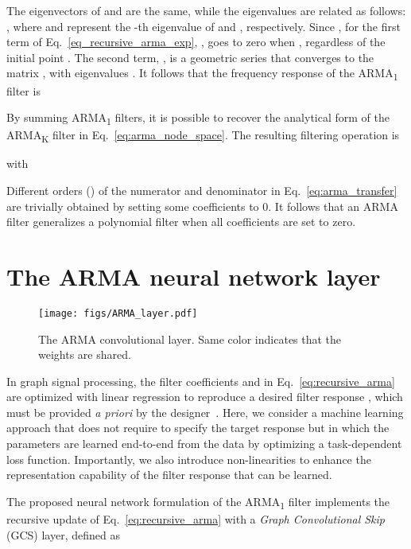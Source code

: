 \documentclass{article}
\begin{document}
The eigenvectors of  and  are the same, while the eigenvalues are related as follows: , where  and  represent the -th eigenvalue of  and , respectively. 
Since , for  the first term of Eq.~\eqref{eq_recursive_arma_exp}, , goes to zero when , regardless of the initial point .
The second term, , is a geometric series that converges to the matrix , with eigenvalues .
It follows that the frequency response of the ARMA\textsubscript{1} filter is



By summing  ARMA\textsubscript{1} filters, it is possible to recover the analytical form of the ARMA\textsubscript{K} filter in Eq.~\eqref{eq:arma_node_space}.
The resulting filtering operation is

with 



Different orders () of the numerator and denominator in Eq.~\eqref{eq:arma_transfer} are trivially obtained by setting some coefficients to 0. 
It follows that an ARMA filter generalizes a polynomial filter when all coefficients  are set to zero.

\section{The ARMA neural network layer} 
\label{sec:arma}

\begin{figure*}[!ht]
	\centering
	\texttt{[image: figs/ARMA\_layer.pdf]}	
    \caption{The ARMA convolutional layer. Same color indicates that the weights are shared. }
	\label{fig:ARMA_block}
\end{figure*}

In graph signal processing, the filter coefficients  and  in Eq.~\eqref{eq:recursive_arma} are optimized with linear regression to reproduce a desired filter response , which must be provided \textit{a priori} by the designer~\cite{isufi2016autoregressive}.
Here, we consider a machine learning approach that does not require to specify the target response  but in which the parameters are learned end-to-end from the data by optimizing a task-dependent loss function.
Importantly, we also introduce non-linearities to enhance the representation capability of the filter response that can be learned. 

The proposed neural network formulation of the ARMA\textsubscript{1} filter implements the recursive update of Eq.~\eqref{eq:recursive_arma} with a \textit{Graph Convolutional Skip} (GCS) layer, defined as
\end{document}
